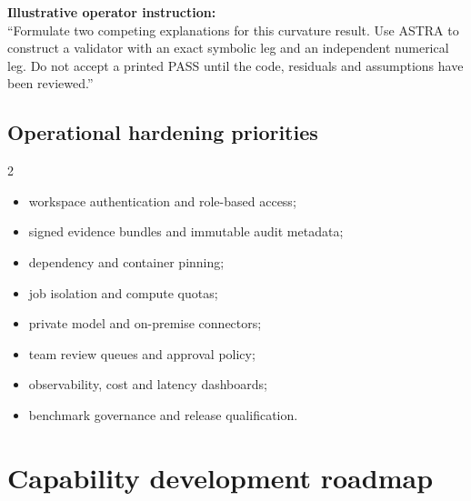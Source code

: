 \documentclass[10pt,a4paper]{article}
\begin{document}
\begin{plainbox}
\textbf{Illustrative operator instruction:}\\
``Formulate two competing explanations for this curvature result. Use ASTRA to
construct a validator with an exact symbolic leg and an independent numerical leg.
Do not accept a printed PASS until the code, residuals and assumptions have been
reviewed.''
\end{plainbox}

\subsection*{Operational hardening priorities}

\begin{multicols}{2}
\begin{itemize}
  \item workspace authentication and role-based access;
  \item signed evidence bundles and immutable audit metadata;
  \item dependency and container pinning;
  \item job isolation and compute quotas;
  \item private model and on-premise connectors;
  \item team review queues and approval policy;
  \item observability, cost and latency dashboards;
  \item benchmark governance and release qualification.
\end{itemize}
\end{multicols}

\section*{Capability development roadmap}
\end{document}
